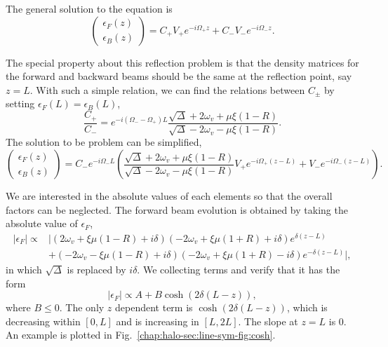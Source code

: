 The general solution to the equation is
\begin{equation*}
   \begin{pmatrix}
   \epsilon_F(z) \\
   \epsilon_B(z)
   \end{pmatrix} = C_+ V_+ e^{-i \Omega_+ z} +  C_- V_- e^{-i \Omega_- z}.
\end{equation*}

The special property about this reflection problem is that the density matrices for the forward and backward beams should be the same at the reflection point, say $z=L$. With such a simple relation, we can find the relations between $C_\pm$ by setting $\epsilon_F(L)=\epsilon_B(L)$,
\begin{equation}
   \frac{C_+}{C_-} = e^{-i(\Omega_- -\Omega_+)L} \frac{ \sqrt{\Delta} +  2\omega_v + \mu \xi (1-R) }{\sqrt{\Delta} -  2\omega_v - \mu \xi (1-R)}.
\end{equation}
The solution to be problem can be simplified,
\begin{equation}
   \begin{pmatrix}
   \epsilon_F(z) \\
   \epsilon_B(z)
   \end{pmatrix} = C_- e^{-i\Omega_- L} \left( \frac{ \sqrt{\Delta} +  2\omega_v + \mu \xi (1-R) }{\sqrt{\Delta} -  2\omega_v - \mu \xi (1-R)} V_+ e^{-i \Omega_+ (z-L)} +  V_- e^{-i \Omega_- (z-L)} \right).
\end{equation}

We are interested in the absolute values of each elements so that the overall factors can be neglected. The forward beam evolution is obtained by taking the absolute value of $\epsilon_F$,
\begin{align*}
   \left\vert \epsilon_F \right\vert \propto & \lvert (2\omega_v +\xi\mu(1-R) +i \delta ) ( -2\omega_v + \xi\mu(1+R) + i \delta ) e^{\delta(z-L)} \\ 
   &+ ( -2\omega_v - \xi\mu(1-R) +i \delta ) ( -2\omega_v + \xi\mu(1+R) - i \delta ) e^{-\delta(z-L)} \rvert,
\end{align*}
in which $\sqrt{\Delta}$ is replaced by $i \delta$. We collecting terms and verify that it has the form
\begin{equation}
   \left\vert \epsilon_F \right\vert \propto A + B \cosh( 2\delta(L-z) ),
\end{equation}
where $B\leq 0$.
The only $z$ dependent term is $\cosh( 2\delta(L-z) )$, which is decreasing within $[0,L]$ and is increasing in $[L,2L]$. The slope at $z=L$ is 0. An example is plotted in Fig.~\ref{chap:halo-sec:line-sym-fig:cosh}.


